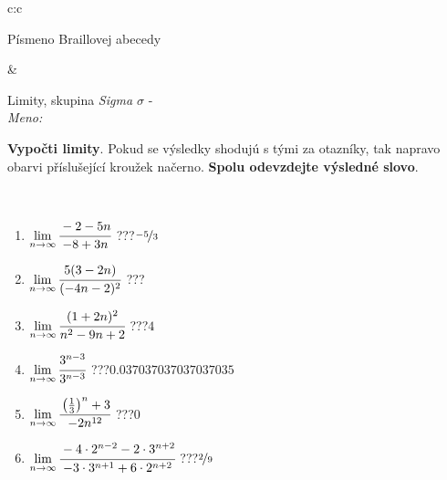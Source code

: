 \documentclass[10pt]{report}
\begin{document}
\begin{tabular}{c:c}
\begin{minipage}[c][104.5mm][t]{0.5\linewidth}
\begin{center}
\begin{minipage}{0.20\linewidth}
\begin{center}
{\small Písmeno Braillovej abecedy}
\end{center}
\end{minipage}
\end{center}
\end{minipage}
&
\begin{minipage}[c][104.5mm][t]{0.5\linewidth}
\begin{center}
\vspace{7mm}
{\huge Limity, skupina \textit{Sigma $\sigma$} -}\\[5mm]
\textit{Meno:}\phantom{xxxxxxxxxxxxxxxxxxxxxxxxxxxxxxxxxxxxxxxxxxxxxxxxxxxxxxxxxxxxxxxxx}\\[5mm]
\begin{minipage}{0.95\linewidth}
\begin{center}
\textbf{Vypočti limity}. Pokud se výsledky shodujú s tými za otazníky, tak napravo\\obarvi příslušející kroužek načerno. \textbf{Spolu odevzdejte výsledné slovo}.
\end{center}
\end{minipage}
\\[1mm]
\begin{minipage}{0.79\linewidth}
\begin{center}
\begin{varwidth}{\linewidth}
\begin{enumerate}
\normalsize
\item $\lim\limits_{n\to\infty}\cfrac{-2-5n}{-8+3n}$\quad \dotfill\; ???\;\dotfill \quad $\nicefrac{-5}{3}$
\item $\lim\limits_{n\to\infty}\cfrac{5(3-2n)}{(-4n-2)^2}$\quad \dotfill\; ???\;\dotfill {}
\item $\lim\limits_{n\to\infty}\cfrac{(1+2n)^2}{n^2-9n+2}$\quad \dotfill\; ???\;\dotfill \quad $4$
\item $\lim\limits_{n\to\infty}\cfrac{3^{n-3}}{3^{n-3}}$\quad \dotfill\; ???\;\dotfill \quad $0.037037037037037035$
\item $\lim\limits_{n\to\infty}\cfrac{\left(\frac{1}{3}\right)^n +3}{-2n^{12}}$\quad \dotfill\; ???\;\dotfill \quad $0$
\item $\lim\limits_{n\to\infty}\cfrac{-4\cdot 2^{n-2}-2\cdot 3^{n+2}}{-3\cdot 3^{n+1}+6\cdot 2^{n+2}}$\quad \dotfill\; ???\;\dotfill \quad $\nicefrac{2}{9}$
\end{enumerate}
\end{varwidth}
\end{center}
\end{minipage}

\end{center}
\end{minipage}
\end{tabular}
\end{document}

